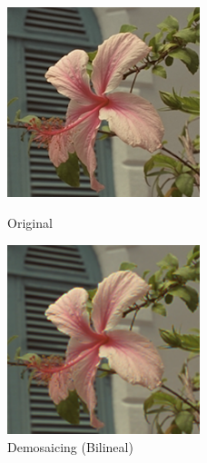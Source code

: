 {

\begin{figure}[h]
\begin{center}
       \includegraphics[width=0.5\textwidth]{imagenes/img3_blur_original.png}
        \caption{Original}
        \end{center}
\endminipage
{}
\begin{center}
       \includegraphics[width=0.5\textwidth]{imagenes/img3_blur.png}
        \caption{Demosaicing (Bilineal)}
         \end{center}
\endminipage
\end{figure}



}
